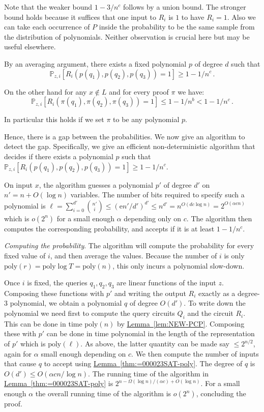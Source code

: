 \documentclass[11pt]{article}
\newcommand{\expref}[2]{\texorpdfstring{\hyperref[#2]{#1~\ref{#2}}}{#1~\ref{#2}}}
\newcommand{\eee}{\mathrm e}
\renewcommand{\P}{\mathbb{P}}
\newcommand{\poly}{\mathrm{poly}}
\begin{document}
Note that the weaker bound $1-3/n^{c}$ follows by a union bound.
The stronger bound holds because it suffices that one input to $R_{i}$
is $1$ to have $R_{i}=1$. Also we can take each occurrence of $P$
inside the probability to be the same sample from the distribution
of polynomials. Neither observation is crucial here but may be useful
elsewhere.

By an averaging argument, there exists a fixed polynomial $p$ of
degree $d$ such that
\[
\P_{z,i}[R_{i}(p(q_{1}),p(q_{2}),p(q_{3}))=1]\ge1-1/n^{c}\,.
\]

On the other hand for any $x\not\in L$ and for every proof $\pi$
we have:
\[
\P_{z,i}[R_{i}(\pi(q_{1}),\pi(q_{2}),\pi(q_{3}))=1]\le1-1/n^{b}<1-1/n^{c}\,.
\]

In particular this holds if we set $\pi$ to be any polynomial $p$.

Hence, there is a gap between the probabilities. We now give an algorithm
to detect the gap. Specifically, we give an efficient non-deterministic
algorithm that decides if there exists a polynomial $p$ such that
$\P_{z,i}[R_{i}(p(q_{1}),p(q_{2}),p(q_{3}))=1]\ge1-1/n^{c}.$

On input $x$, the algorithm guesses a polynomial $p'$ of degree
$d'$ on $n'=n+O(\log n)$ variables. The number of bits required
to specify such a polynomial is
$\ell=\sum_{i=0}^{d'}\binom{n'}{i}\le(\eee n'/d')^{d'}\le n^{d'}=n^{O(dc\log n)}=2^{O(\alpha cn)}$
which is $o(2^{n})$ for a small enough $\alpha$ depending only on
$c$. The algorithm then computes the corresponding probability, and
accepts if it is at least $1-1/n^{c}$.

\emph{Computing the probability}. The algorithm will compute the probability
for every fixed value of $i$, and then average the values. Because
the number of $i$ is only $\poly(r)=\poly\log T=\poly(n)$, this
only incurs a polynomial slow-down.

Once $i$ is fixed, the queries $q_{1},q_{2},q_{3}$ are linear functions
of the input $z$. Composing these functions with $p'$ and writing
the output $R_{i}$ exactly as a degree-3 polynomial, we obtain a
polynomial $q$ of degree $O(d')$. To write down the polynomial we
need first to compute the query circuits $Q_{i}$ and the circuit
$R_{i}$. This can be done in time $\poly(n)$ by \expref{Lemma}{lem:NEW-PCP}.
Composing these with $p'$ can be done in time polynomial in the length
of the representation of $p'$ which is $\poly(\ell)$. As above,
the latter quantity can be made say $\le2^{n/2}$, again for $\alpha$
small enough depending on $c$. We then compute the number of inputs
that cause $q$ to accept using \expref{Lemma}{thm:=000023SAT-poly}.
The degree of $q$ is $O(d')\le O(\alpha cn/\log n)$. The running
time of the algorithm in \expref{Lemma}{thm:=000023SAT-poly} is $2^{n-\Omega(\log n)/(\alpha c)+O(\log n)}$.
For a small enough $\alpha$ the overall running time of the algorithm
is $o(2^{n})$, concluding the proof.
\end{document}
